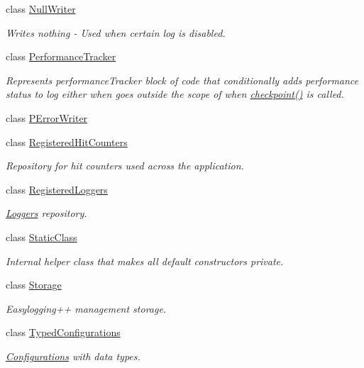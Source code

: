 \begin{DoxyCompactItemize}
class \hyperlink{classel_1_1base_1_1_null_writer}{Null\+Writer}
\begin{DoxyCompactList}\small\item\em Writes nothing -\/ Used when certain log is disabled. \end{DoxyCompactList}\item 
class \hyperlink{classel_1_1base_1_1_performance_tracker}{Performance\+Tracker}
\begin{DoxyCompactList}\small\item\em Represents performance\+Tracker block of code that conditionally adds performance status to log either when goes outside the scope of when \hyperlink{classel_1_1base_1_1_performance_tracker_aec9a6e149674c5782cc855e49aeb0aaf}{checkpoint()} is called. \end{DoxyCompactList}\item 
class \hyperlink{classel_1_1base_1_1_p_error_writer}{P\+Error\+Writer}
\item 
class \hyperlink{classel_1_1base_1_1_registered_hit_counters}{Registered\+Hit\+Counters}
\begin{DoxyCompactList}\small\item\em Repository for hit counters used across the application. \end{DoxyCompactList}\item 
class \hyperlink{classel_1_1base_1_1_registered_loggers}{Registered\+Loggers}
\begin{DoxyCompactList}\small\item\em \hyperlink{classel_1_1_loggers}{Loggers} repository. \end{DoxyCompactList}\item 
class \hyperlink{classel_1_1base_1_1_static_class}{Static\+Class}
\begin{DoxyCompactList}\small\item\em Internal helper class that makes all default constructors private. \end{DoxyCompactList}\item 
class \hyperlink{classel_1_1base_1_1_storage}{Storage}
\begin{DoxyCompactList}\small\item\em Easylogging++ management storage. \end{DoxyCompactList}\item 
class \hyperlink{classel_1_1base_1_1_typed_configurations}{Typed\+Configurations}
\begin{DoxyCompactList}\small\item\em \hyperlink{classel_1_1_configurations}{Configurations} with data types. \end{DoxyCompactList}\item 

\end{DoxyCompactItemize}
